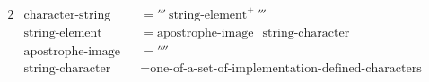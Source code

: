 \documentclass{article}
\begin{document}
\begin{alignat*}{2}
&\text{character-string} &&= '''\ \text{string-element}^+\ '''\\
&\text{string-element} &&= \text{apostrophe-image}\ |\ \text{string-character}\\
&\text{apostrophe-image} &&= ''''\\
&\text{string-character} &&= \text{one-of-a-set-of-implementation-defined-characters}
\end{alignat*}
\end{document}
